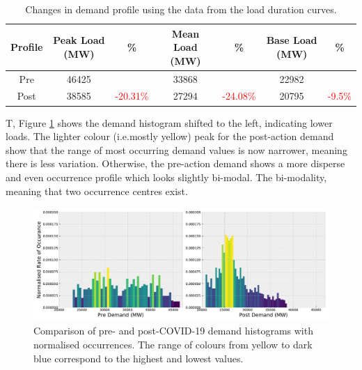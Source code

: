 \documentclass[energies,article,submit,moreauthors,pdftex]{Definitions/mdpi}
\begin{document}
\begin{table}[H]
\caption{Changes in demand profile using the data from the load duration curves. }
\centering
\begin{tabular}{ccccccc}
\toprule
\textbf{Profile} & \textbf{Peak Load (MW)}	& \textbf{\%} & \textbf{ Mean Load (MW)}	& \textbf{\%}	& \textbf{ Base Load (MW)}	& \textbf{\%}\\
\midrule
Pre	& 46425 & & 33868 & & 22982 &  \\
Post & 38585 & \textcolor{red}{-20.31\%} & 27294 & \textcolor{red}{-24.08\%} & 20795 & \textcolor{red}{-9.5\%} \\

\bottomrule
\end{tabular}
\label{table:load-duration}
\end{table}






T, Figure \ref{fig:Demand_hist} shows the demand histogram shifted to the left, indicating lower loads. The lighter colour (i.e.mostly yellow) peak for the post-action demand show that the range of most occurring demand values is now narrower, meaning there is less variation. Otherwise, the pre-action demand shows a more disperse and even occurrence profile which looks slightly bi-modal. The bi-modality, meaning that two occurrence centres exist. 




\begin{figure}[H] 
\centering
\hspace{-25pt}\includegraphics[width=16.5 cm]{Graphics/Demand_hist_coloured_sidebyside.pdf}
\caption{Comparison of pre- and post-COVID-19 demand histograms with normalised occurrences. The range of colours from yellow to dark blue correspond to the highest and lowest values.}\label{fig:Demand_hist}
\end{figure}  
\end{document}

